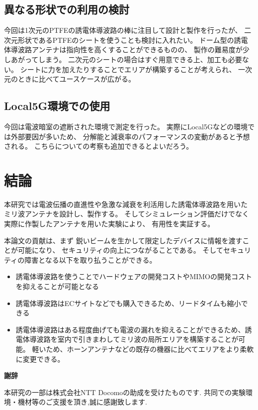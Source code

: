\documentclass[technicalreport]{ieicej}
\begin{document}
\subsection{異なる形状での利用の検討}

今回は1次元のPTFEの誘電体導波路の棒に注目して設計と製作を行ったが、
二次元形状であるPTFEのシートを使うことも検討に入れたい。
ドーム型の誘電体導波路アンテナは指向性を高くすることができるものの、
製作の難易度が少しあがってしまう。
二次元のシートの場合はすぐ用意できる上、加工も必要ない。
シートに力を加えたりすることでエリアが構築することが考えられ、
一次元のときに比べてユースケースが広がる。

\subsection{Local5G環境での使用}

今回は電波暗室の遮断された環境で測定を行った。
実際にLocal5Gなどの環境では外部要因が多いため、
分解能と減衰率のパフォーマンスの変動があると予想される。
こちらについての考察も追加できるとよいだろう。

\section{結論}

本研究では電波伝播の直進性や急激な減衰を利活用した誘電体導波路を用いた
ミリ波アンテナを設計し、製作する。
そしてシミュレーション評価だけでなく実際に作製したアンテナを用いた実験により、
有用性を実証する。

本論文の貢献は、まず
鋭いビームを生かして限定したデバイスに情報を渡すことが可能になり、
セキュリティの向上につながることである。
そしてセキュリティの障害となる以下を取り払うことができる。

\begin{itemize}
  \item 誘電体導波路を使うことでハードウェアの開発コストやMIMOの開発コストを抑えることが可能となる
  \item 誘電体導波路はECサイトなどでも購入できるため、リードタイムも縮小できる
  \item 誘電体導波路はある程度曲げても電波の漏れを抑えることができるため、誘電体導波路を室内で引きまわしてミリ波の局所エリアを構築することが可能。
  軽いため、ホーンアンテナなどの既存の機器に比べてエリアをより柔軟に変更できる。
\end{itemize}

\begin{center}
  \Large \textbf{謝辞}
\end{center}

本研究の一部は株式会社NTT Docomoの助成を受けたものです.
共同での実験環境・機材等のご支援を頂き,誠に感謝致します.

%
%

\end{document}
